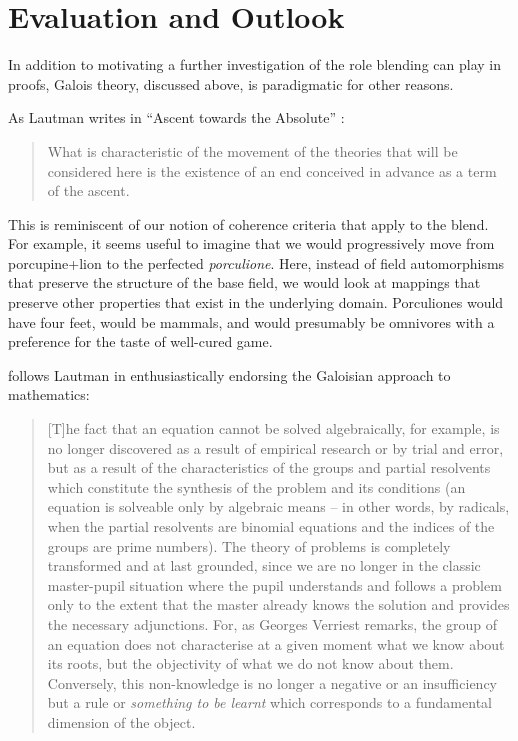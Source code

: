 \section{Evaluation and Outlook}
\label{sec:eval}

In addition to motivating a further investigation of the role blending
can play in proofs, Galois theory, discussed above, is paradigmatic
for other reasons.

As Lautman writes in ``Ascent towards the Absolute'' \cite[p. 126]{lautman2011mathematics}:
\begin{quote}
What is characteristic of the movement of the theories that will be
considered here is the existence of an end conceived in advance as a
term of the ascent.
\end{quote}

This is reminiscent of our notion of coherence criteria that apply to
the blend.  For example, it seems useful to imagine that we would
progressively move from porcupine+lion to the perfected
\emph{porculione}.  Here, instead of field automorphisms that preserve
the structure of the base field, we would look at mappings that
preserve other properties that exist in the underlying domain.
Porculiones would have four feet, would be mammals, and would
presumably be omnivores with a preference for the taste of well-cured
game.

\cite[pp. 227--228]{deleuze1994difference} follows
Lautman in enthusiastically endorsing the Galoisian approach to
mathematics:
\begin{quote}
[T]he fact that an equation cannot be solved algebraically, for
example, is no longer discovered as a result of empirical research or
by trial and error, but as a result of the characteristics of the
groups and partial resolvents which constitute the synthesis of the
problem and its conditions (an equation is solveable only by algebraic
means -- in other words, by radicals, when the partial resolvents are
binomial equations and the indices of the groups are prime numbers).
The theory of problems is completely transformed and at last grounded,
since we are no longer in the classic master-pupil situation where the
pupil understands and follows a problem only to the extent that the
master already knows the solution and provides the necessary
adjunctions.  For, as Georges Verriest remarks, the group of an
equation does not characterise at a given moment what we know about
its roots, but the objectivity of what we do not know about them.
Conversely, this non-knowledge is no longer a negative or an
insufficiency but a rule or \emph{something to be learnt} which
corresponds to a fundamental dimension of the object.
\end{quote}

